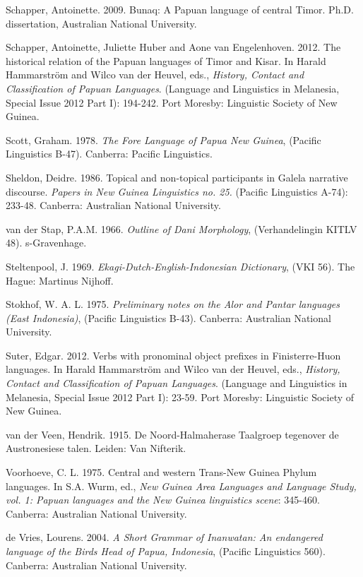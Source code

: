 Schapper, Antoinette. 2009. Bunaq: A Papuan language of central Timor. Ph.D. dissertation, Australian National University.

Schapper, Antoinette, Juliette Huber and Aone van Engelenhoven. 2012. The historical relation of the Papuan languages of Timor and Kisar. In Harald Hammarstr\"om and Wilco van der Heuvel, eds., \textit{History, Contact and Classification of Papuan Languages}. (Language and Linguistics in Melanesia, Special Issue 2012 Part I): 194-242. Port Moresby: Linguistic Society of New Guinea.

Scott, Graham. 1978. \textit{The Fore Language of Papua New Guinea}, (Pacific Linguistics B-47). Canberra: Pacific Linguistics.

Sheldon, Deidre. 1986. Topical and non-topical participants in Galela narrative discourse. \textit{Papers in New Guinea Linguistics no. 25.} (Pacific Linguistics A-74): 233-48. Canberra: Australian National University.

van der Stap, P.A.M. 1966. \textit{Outline of Dani Morphology}, (Verhandelingin KITLV 48). {\textquotesingle}s-Gravenhage.

Steltenpool, J. 1969. \textit{Ekagi-Dutch-English-Indonesian Dictionary}, (VKI 56). The Hague: Martinus Nijhoff.

Stokhof, W. A. L. 1975. \textit{Preliminary notes on the Alor and Pantar languages (East Indonesia)}, (Pacific Linguistics B-43). Canberra: Australian National University.

Suter, Edgar. 2012. Verbs with pronominal object prefixes in Finisterre-Huon languages. In Harald Hammarstr\"om and Wilco van der Heuvel, eds., \textit{History, Contact and Classification of Papuan Languages}. (Language and Linguistics in Melanesia, Special Issue 2012 Part I): 23-59. Port Moresby: Linguistic Society of New Guinea.

van der Veen, Hendrik. 1915. De Noord-Halmahera{\textquotesingle}se Taalgroep tegenover de Austronesiese talen. Leiden: Van Nifterik.

Voorhoeve, C. L. 1975. Central and western Trans-New Guinea Phylum languages. In S.A. Wurm, ed., \textit{New Guinea Area Languages and Language Study, vol. 1: Papuan languages and the New Guinea linguistics scene}: 345-460. Canberra: Australian National University.

de Vries, Lourens. 2004. \textit{A Short Grammar of Inanwatan: An endangered language of the Bird{\textquotesingle}s Head of Papua, Indonesia}, (Pacific Linguistics 560). Canberra: Australian National University.

